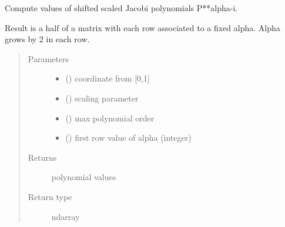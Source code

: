 \documentclass[letterpaper,10pt,english]{sphinxmanual}
\begin{document}
\begin{fulllineitems}
\label{\detokenize{petgem/hvfem:petgem.hvfem.PolyJacobi}}
Compute values of shifted scaled Jacobi polynomials P**alpha-i.

Result is a half of a matrix with each row associated to a fixed alpha.
Alpha grows by 2 in each row.
\begin{quote}\begin{description}
\item[{Parameters}] \leavevmode\begin{itemize}
\item {} 
 () \textendash{} coordinate from {[}0,1{]}

\item {} 
 () \textendash{} scaling parameter

\item {} 
 () \textendash{} max polynomial order

\item {} 
 () \textendash{} first row value of alpha (integer)

\end{itemize}

\item[{Returns}] \leavevmode
polynomial values

\item[{Return type}] \leavevmode
ndarray

\end{description}\end{quote}

\end{fulllineitems}

\end{document}
